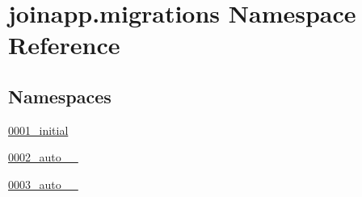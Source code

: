 \hypertarget{namespacejoinapp_1_1migrations}{}\section{joinapp.\+migrations Namespace Reference}
\label{namespacejoinapp_1_1migrations}
\subsection*{Namespaces}
\begin{DoxyCompactItemize}
\item 
 \mbox{\hyperlink{namespacejoinapp_1_1migrations_1_10001__initial}{0001\+\_\+initial}}
\item 
 \mbox{\hyperlink{namespacejoinapp_1_1migrations_1_10002__auto__20190605__1443}{0002\+\_\+auto\+\_\+\_}}
\item 
 \mbox{\hyperlink{namespacejoinapp_1_1migrations_1_10003__auto__20190605__1445}{0003\+\_\+auto\+\_\+\_}}
\end{DoxyCompactItemize}
